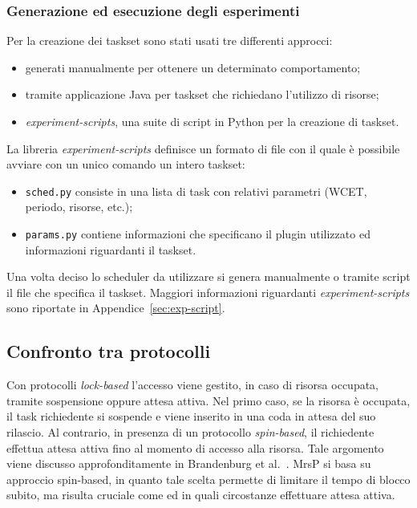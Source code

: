 \subsubsection{Generazione ed esecuzione degli esperimenti}

\noindent Per la creazione dei taskset sono stati usati tre differenti approcci:

\begin{itemize}
	\item generati manualmente per ottenere un determinato comportamento;
	\item tramite applicazione Java per taskset che richiedano l'utilizzo di risorse;
	\item \textit{experiment-scripts}, una suite di script in Python per la creazione di taskset.
\end{itemize}

\noindent La libreria \textit{experiment-scripts} definisce un formato di file con il quale è possibile avviare con un unico comando un intero taskset:

\begin{itemize}
  \item \texttt{sched.py} consiste in una lista di task con relativi parametri (WCET, periodo, risorse, etc.);
  \item \texttt{params.py} contiene informazioni che specificano il plugin utilizzato ed informazioni riguardanti il taskset.
\end{itemize}

\noindent Una volta deciso lo scheduler da utilizzare si genera manualmente o tramite script il file che specifica il taskset. Maggiori informazioni riguardanti \textit{experiment-scripts} sono riportate in Appendice~\ref{sec:exp-script}.\\

\newpage

\subsection{Confronto tra protocolli}
\label{sec:confronto_protocolli}

\noindent Con protocolli \textit{lock-based} l'accesso viene gestito, in caso di risorsa occupata, tramite sospensione oppure attesa attiva. Nel primo caso, se la risorsa è occupata, il task richiedente si sospende e viene inserito in una coda in attesa del suo rilascio. Al contrario, in presenza di un protocollo \textit{spin-based}, il richiedente effettua attesa attiva fino al momento di accesso alla risorsa. Tale argomento viene discusso approfonditamente in Brandenburg et al.~\cite{Brandenburg:2008:RSM:1440456.1440601}. MrsP si basa su approccio spin-based, in quanto tale scelta permette di limitare il tempo di blocco subito, ma risulta cruciale come ed in quali circostanze effettuare attesa attiva.\\


